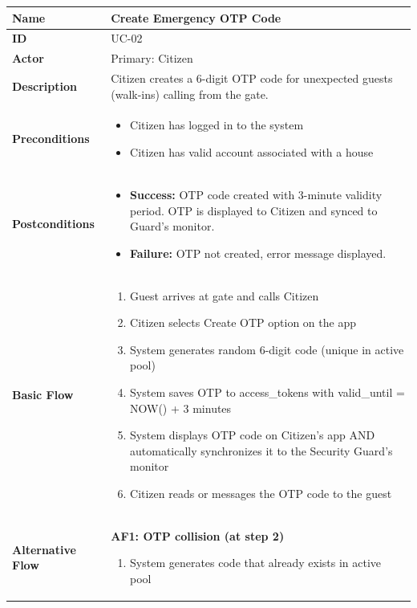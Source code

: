 \documentclass[a4paper]{article}
\newlength{\ucLeft}
\begin{document}
\begin{longtable}{|>{\bfseries}p{\ucLeft}|
                p{\dimexpr\textwidth-\ucLeft-4\tabcolsep-3\arrayrulewidth\relax}|}
\hline
Name & Create Emergency OTP Code \\ \hline
ID & UC-02 \\ \hline
Actor & Primary: Citizen \\ \hline
Description & Citizen creates a 6-digit OTP code for unexpected guests (walk-ins) calling from the gate.\\ \hline
Preconditions &
\begin{itemize}[leftmargin=*, nosep, topsep=0pt, partopsep=0pt, parsep=0pt]
    \item Citizen has logged in to the system
    \item Citizen has valid account associated with a house
\end{itemize}
\\ \hline
Postconditions &
\begin{itemize}[leftmargin=*, nosep, topsep=0pt, partopsep=0pt, parsep=0pt, after=\strut]
    \item \textbf{Success:} OTP code created with 3-minute validity period. OTP is displayed to Citizen and synced to Guard's monitor.
    \item \textbf{Failure:} OTP not created, error message displayed.
\end{itemize}
\\ \hline
Basic Flow & 
\begin{enumerate}[leftmargin=*, nosep, topsep=0pt, partopsep=0pt, parsep=0pt]
    \item Guest arrives at gate and calls Citizen
    \item Citizen selects Create OTP option on the app
    \item System generates random 6-digit code (unique in active pool)
    \item System saves OTP to access\_tokens with valid\_until = NOW() + 3 minutes
    \item System displays OTP code on Citizen's app AND automatically synchronizes it to the Security Guard's monitor
    \item Citizen reads or messages the OTP code to the guest
\end{enumerate}
\\ \hline
Alternative Flow &
\noindent \textbf{AF1: OTP collision (at step 2)}
\begin{enumerate}
    \item System generates code that already exists in active pool

\end{enumerate}
\end{longtable}
\end{document}
